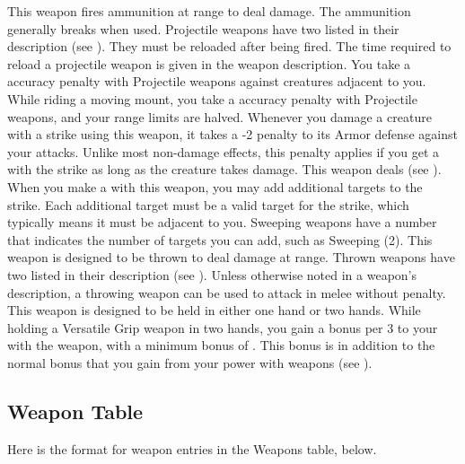      This weapon fires ammunition at range to deal damage.
    The ammunition generally breaks when used.
    Projectile weapons have two  listed in their description (see ).
    They must be reloaded after being fired.
    The time required to reload a projectile weapon is given in the weapon description.
    You take a  accuracy penalty with Projectile weapons against creatures adjacent to you.
    While riding a moving mount, you take a  accuracy penalty with Projectile weapons, and your range limits are halved.
     Whenever you damage a creature with a strike using this weapon, it  takes a -2 penalty to its Armor defense against your attacks.
    Unlike most non-damage effects, this penalty applies if you get a  with the strike as long as the creature takes damage.
     This weapon deals  (see ).
    \label{Sweeping} When you make a   with this weapon, you may add additional targets to the strike.
    Each additional target must be a valid target for the strike, which typically means it must be adjacent to you.
    Sweeping weapons have a number that indicates the number of targets you can add, such as Sweeping (2).
     This weapon is designed to be thrown to deal damage at range.
    Thrown weapons have two  listed in their description (see ).
    Unless otherwise noted in a weapon's description, a throwing weapon can be used to attack in melee without penalty.
     This weapon is designed to be held in either one hand or two hands.
    While holding a Versatile Grip weapon in two hands, you gain a  bonus per 3  to your  with the weapon, with a minimum bonus of .
    This bonus is in addition to the normal bonus that you gain from your power with weapons (see ).

  \subsection{Weapon Table}
    Here is the format for weapon entries in the Weapons table, below.

